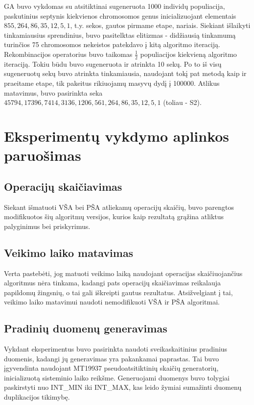\documentclass{VUMIFInfKursinis}
\begin{document}
GA buvo vykdomas su atsitiktinai sugeneruota 1000 individų populiacija,
paskutinius septynis kiekvienos chromosomos genus inicializuojant elementais $855, 264, 86, 35, 12, 5, 1$, t.y. sekos, gautos pirmame etape, nariais.
Siekiant išlaikyti tinkamiausius sprendinius, buvo pasitelktas elitizmas - didžiausią tinkamumą turinčios 75 chromosomos nekeistos
patekdavo į kitą algoritmo iteraciją.
Rekombinacijos operatorius buvo taikomas $\frac{1}{2}$ populiacijos kiekvieną algoritmo iteraciją.
Tokiu būdu buvo sugeneruota ir atrinkta 10 sekų.
Po to iš visų sugeneruotų sekų buvo atrinkta tinkamiausia, naudojant tokį pat metodą kaip ir praeitame etape, tik pakeitus rikiuojamų masyvų dydį į 100000.
Atlikus matavimus, buvo pasirinkta seka $45794, 17396, 7414, 3136, 1206, 561, 264, 86, 35, 12, 5, 1$ (toliau - S2).


\section{Eksperimentų vykdymo aplinkos paruošimas}

\subsection{Operacijų skaičiavimas}

Siekant išmatuoti VŠA bei PŠA atliekamų operacijų skaičių,
buvo parengtos modifikuotos šių algoritmų versijos, kurios kaip rezultatą grąžina atliktus palyginimus bei priskyrimus.

\subsection{Veikimo laiko matavimas}

Verta pastebėti, jog matuoti veikimo laiką naudojant operacijas skaičiuojančius algoritmus nėra tinkama,
kadangi pats operacijų skaičiavimas reikalauja papildomų žingsnių, o tai gali iškreipti gautus rezultatus.
Atsižvelgiant į tai, veikimo laiko matavimui naudoti nemodifikuoti VŠA ir PŠA algoritmai. 

\subsection{Pradinių duomenų generavimas}

Vykdant eksperimentus buvo pasirinkta naudoti sveikaskaitinius pradinius duomenis, kadangi jų generavimas yra pakankamai paprastas.
Tai buvo įgyvendinta naudojant MT19937 pseudoatsitiktinių skaičių generatorių, inicializuotą sisteminio laiko reikšme.
Generuojami duomenys buvo tolygiai paskirstyti nuo INT\_MIN iki INT\_MAX, kas leido žymiai sumažinti duomenų duplikacijos tikimybę.
\end{document}
